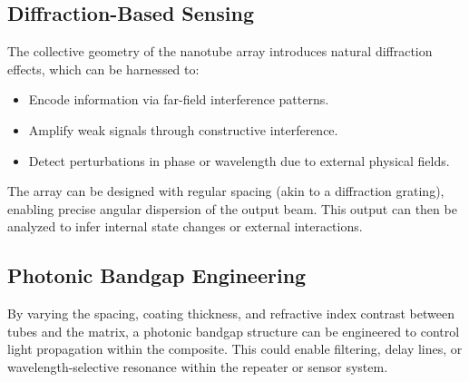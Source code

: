 \documentclass[11pt]{article}
\begin{document}
	\subsection{Diffraction-Based Sensing}
	The collective geometry of the nanotube array introduces natural diffraction effects, which can be harnessed to:
	\begin{itemize}
		\item Encode information via far-field interference patterns.
		\item Amplify weak signals through constructive interference.
		\item Detect perturbations in phase or wavelength due to external physical fields.
	\end{itemize}
	The array can be designed with regular spacing (akin to a diffraction grating), enabling precise angular dispersion of the output beam. This output can then be analyzed to infer internal state changes or external interactions.
	
	\subsection{Photonic Bandgap Engineering}
	By varying the spacing, coating thickness, and refractive index contrast between tubes and the matrix, a photonic bandgap structure can be engineered to control light propagation within the composite. This could enable filtering, delay lines, or wavelength-selective resonance within the repeater or sensor system.
	
\end{document}
